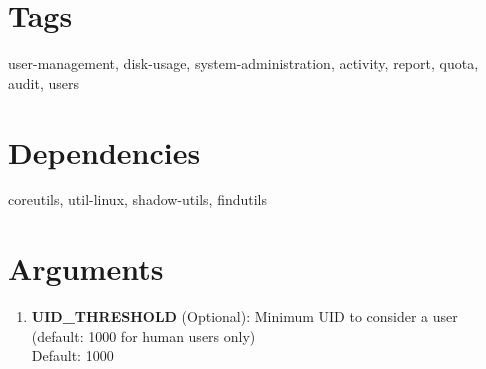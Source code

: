 \documentclass[openany]{book}
\begin{document}
\section*{Tags}
user-management, disk-usage, system-administration, activity, report, quota, audit, users

\section*{Dependencies}
coreutils, util-linux, shadow-utils, findutils


\section*{Arguments}
\begin{enumerate}
  \item \textbf{UID\_THRESHOLD} (Optional): Minimum UID to consider a user (default: 1000 for human users only) \\ Default: 1000
\end{enumerate}
\end{document}
